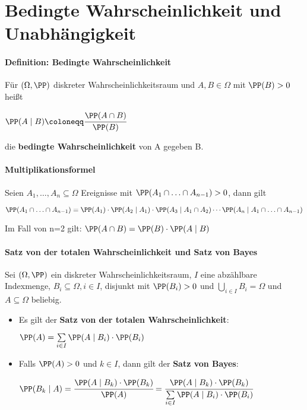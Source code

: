 \section{Bedingte Wahrscheinlichkeit und Unabhängigkeit}
\paragraph{Definition: Bedingte Wahrscheinlichkeit}\label{conditioned}
Für $(\Omega,\PP)$ diskreter Wahrscheinlichkeitsraum und $A,B\in\Omega$ mit $\PP(B)>0$ heißt
\begin{tightcenter}
	$\PP(A\mid B)\coloneqq\cfrac{\PP(A\cap B)}{\PP(B)}$
\end{tightcenter}
die \textbf{bedingte Wahrscheinlichkeit} von A gegeben B.

\paragraph{Multiplikationsformel}
Seien $A_1,\ldots,A_n\subseteq\Omega$ Ereignisse mit $\PP(A_1\cap\ldots\cap A_{n-1})>0$, dann gilt
\begin{tightcenter}
	$\PP(A_1\cap\ldots\cap A_{n-1})=\PP(A_1)\cdot\PP(A_2\mid A_1)\cdot\PP(A_3\mid A_1\cap A_2)\cdots\PP(A_n\mid A_1\cap\ldots\cap A_{n-1})$
\end{tightcenter}
Im Fall von n=2 gilt: $\PP(A\cap B)=\PP(B)\cdot\PP(A\mid B)$

\paragraph{Satz von der totalen Wahrscheinlichkeit und Satz von Bayes}\label{bayes}
Sei $(\Omega,\PP)$ ein diskreter Wahrscheinlichkeitsraum, $I$ eine abzählbare Indexmenge, $B_i\subseteq\Omega, i\in I$, disjunkt mit $\PP(B_i)>0$ und $\bigcup\limits_{i\in I}B_i=\Omega$ und $A\subseteq\Omega$ beliebig.
\begin{itemize}
	\item Es gilt der \textbf{Satz von der totalen Wahrscheinlichkeit}:
	\begin{tightcenter}
		$\PP(A)=\sum\limits_{i\in I}\PP(A\mid B_i)\cdot\PP(B_i)$
	\end{tightcenter}
	\item Falls $\PP(A)>0$ und $k\in I$, dann gilt der \textbf{Satz von Bayes}:
	\begin{tightcenter}
		$\PP(B_k\mid A)=\cfrac{\PP(A\mid B_k)\cdot\PP(B_k)}{\PP(A)}=\cfrac{\PP(A\mid B_k)\cdot\PP(B_k)}{\sum\limits_{i\in I}\PP(A\mid B_i)\cdot\PP(B_i)}$
	\end{tightcenter}
\end{itemize}

